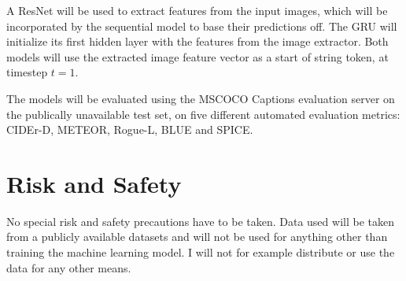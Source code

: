\documentclass[a4paper, twoside]{article}
\begin{document}
A ResNet will be used to extract features from the input images, which will be incorporated by the sequential model to base their predictions off. The GRU will initialize its first hidden layer with the features from the image extractor. Both models will use the extracted image feature vector as a start of string token, at timestep $t=1$.

The models will be evaluated using the MSCOCO Captions evaluation server on the publically unavailable test set, on five different automated evaluation metrics: CIDEr-D, METEOR, Rogue-L, BLUE and SPICE.

\section{Risk and Safety}
No special risk and safety precautions have to be taken. Data used will be taken from a publicly available datasets and will not be used for anything other than training the machine learning model. I will not for example distribute or use the data for any other means.
\end{document}

